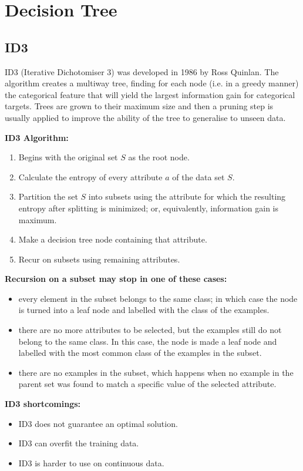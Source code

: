 \documentclass[a4paper, 11pt]{article}
\begin{document}
\section{Decision Tree}

\subsection{ID3}
ID3 (Iterative Dichotomiser 3) was developed in 1986 by Ross Quinlan. The algorithm creates a multiway tree, finding for each node (i.e. in a greedy manner) the categorical feature that will yield the largest information gain for categorical targets. Trees are grown to their maximum size and then a pruning step is usually applied to improve the ability of the tree to generalise to unseen data.

\textbf{ID3 Algorithm:}
\begin{enumerate}
	\item Begins with the original set $S$ as the root node.
	\item Calculate the entropy of every attribute $a$ of the data set $S$.
	\item Partition the set $S$ into subsets using the attribute for which the resulting entropy after splitting is minimized; or, equivalently, information gain is maximum.
	\item Make a decision tree node containing that attribute.
	\item Recur on subsets using remaining attributes.
\end{enumerate}

\textbf{Recursion on a subset may stop in one of these cases:}
\begin{itemize}
	\item every element in the subset belongs to the same class; in which case the node is turned into a leaf node and labelled with the class of the examples.
	\item there are no more attributes to be selected, but the examples still do not belong to the same class. In this case, the node is made a leaf node and labelled with the most common class of the examples in the subset.
	\item there are no examples in the subset, which happens when no example in the parent set was found to match a specific value of the selected attribute.
\end{itemize}

\textbf{ID3 shortcomings:}
\begin{itemize}
	\item ID3 does not guarantee an optimal solution.
	\item ID3 can overfit the training data.
	\item ID3 is harder to use on continuous data.
\end{itemize}
\end{document}
